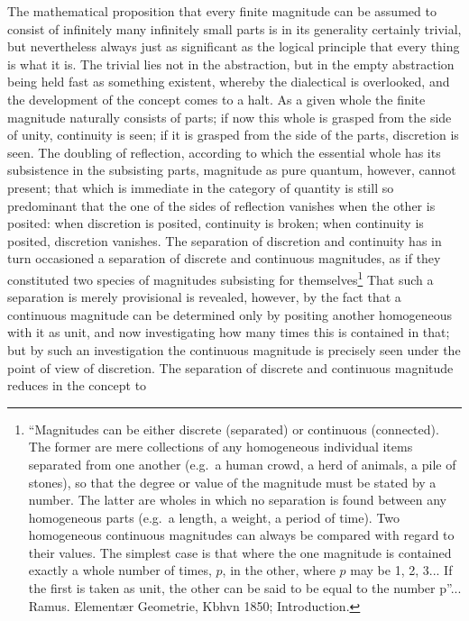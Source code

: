 \documentclass[12pt,a4paper,openany]{book}
\begin{document}
The mathematical proposition that every finite magnitude
can be assumed to consist of infinitely many infinitely
small parts is in its generality certainly trivial, but
nevertheless always just as significant as the logical principle
that every thing is what it is. The trivial lies
not in the abstraction, but in the empty abstraction
being held fast as something existent, whereby the dialectical is overlooked,
and the development of the concept comes to a halt. As a given whole
the finite magnitude naturally consists of parts; if now
this whole is grasped from the side of unity, continuity is seen; if it is grasped
from the side of the parts, discretion is seen. The doubling of reflection,
according to which the essential whole has its subsistence
in the subsisting parts, magnitude as pure
quantum, however, cannot present; that which is immediate in the category of quantity
is still so predominant that the one of the
sides of reflection vanishes when the other is posited: when
discretion is posited, continuity is broken; when continuity is
posited, discretion vanishes. The separation of discretion
and continuity has in turn occasioned a separation of discrete
and continuous magnitudes, as if they constituted two
species of magnitudes subsisting for themselves\footnote[1]{``Magnitudes can be either discrete (separated) or continuous (connected). The former are mere collections of any homogeneous individual items separated from one another (e.g.\ a human crowd, a herd of animals, a pile of stones), so that the degree or value of the magnitude must be stated by a number. The latter are wholes in which no separation is found between any homogeneous parts (e.g.\ a length, a weight, a period of time). Two homogeneous continuous magnitudes can always be compared with regard to their values. The simplest case is that where the one magnitude is contained exactly a whole number of times, $p$, in the other, where $p$ may be 1, 2, 3... If the first is taken as unit, the other can be said to be equal to the number p''... Ramus. Elementær Geometrie, Kbhvn 1850; Introduction.} That such a
separation is merely provisional is revealed, however, by the fact that a
continuous magnitude can be determined only by positing
another homogeneous with it as unit, and now investigating
how many times this is contained in that; but by such an
investigation the continuous magnitude is precisely
seen under the point of view of discretion. The separation of
discrete and continuous magnitude reduces in the concept to
\end{document}
